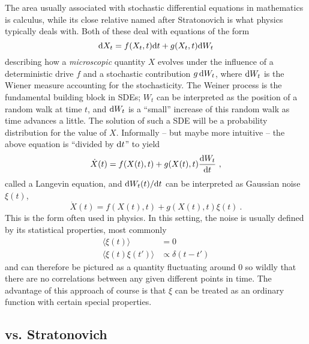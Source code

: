 The area usually associated with stochastic differential equations in mathematics is \Ito{} calculus, while its close relative named after Stratonovich is what physics typically deals with. Both of these deal with equations of the form
%
\begin{equation}
	\label{eqn:sde}
	\mathrm{d} X_t = f(X_t,t) \mathrm{d} t + g(X_t,t) \mathrm{d} W_t
\end{equation}
%
describing how a \emph{microscopic} quantity \(X\) evolves under the influence of a deterministic drive \(f\) and a stochastic contribution \(g\,\mathrm{d} W_t\), where \(\mathrm{d} W_t\) is the Wiener measure accounting for the stochasticity. The Weiner process is the fundamental building block in SDEs; \(W_t\) can be interpreted as the position of a random walk at time \(t\), and \(\mathrm{d} W_t\) is a ``small'' increase of this random walk as time advances a little. The solution of such a SDE will be a probability distribution for the value of \(X\).
Informally -- but maybe more intuitive -- the above equation is ``divided by \(\mathrm{d} t\)'' to yield
%
\begin{equation}
	\dot X(t) = f(X(t),t) + g(X(t),t)\frac{\mathrm{d} W_t}{\mathrm{d} t} ~,
\end{equation}
%
called a Langevin equation, and \(\mathrm{d} W_t(t)/\mathrm{d} t\) can be interpreted as Gaussian noise \(\xi(t)\),
\begin{equation}
	\dot X(t) = f(X(t),t) + g(X(t),t)\xi(t)~.
\end{equation}
%
This is the form often used in physics. In this setting, the noise is usually defined by its statistical properties, most commonly
\begin{align}
	\langle\xi(t)\rangle &= 0 \\
	\langle\xi(t)\xi(t')\rangle &\propto \delta(t-t')
\end{align}
%
and can therefore be pictured as a quantity fluctuating around \(0\) so wildly that there are no correlations between any given different points in time. The advantage of this approach of course is that \(\xi\) can be treated as an ordinary function with certain special properties.



\subsection{\Ito{} vs. Stratonovich}


